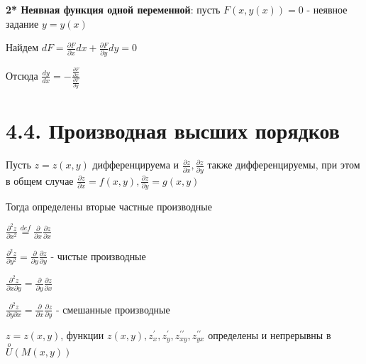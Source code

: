 \documentclass[12pt]{article}
\begin{document}
    \vspace{3mm}
    
    \textbf{2* Неявная функция одной переменной}: пусть $\displaystyle F(x, y(x)) = 0$ - неявное задание $\displaystyle y = y(x)$

    Найдем $\displaystyle dF = \frac{\partial F}{\partial x} dx + \frac{\partial F}{\partial y} dy = 0$

    Отсюда $\displaystyle \frac{dy}{dx} = -\frac{\frac{\partial F}{\partial x}}{\frac{\partial F}{\partial y}}$
    
    \vspace{8mm}

    \section{4.4. Производная высших порядков}

    \hypertarget{secondderivativeoffunctionoftwovariables}{}

    \Nota Пусть $\displaystyle z = z(x, y)$ дифференцируема и $\displaystyle \frac{\partial z}{\partial x}, \frac{\partial z}{\partial y}$ также дифференцируемы, при этом в общем случае
    $\displaystyle \frac{\partial z}{\partial x} = f(x, y), \frac{\partial z}{\partial y} = g(x, y)$

    Тогда определены вторые частные производные
    
    \vspace{3mm}

    \Def $\displaystyle \frac{\partial^2 z}{\partial x^2} \stackrel{def}{=} \frac{\partial}{\partial x} \frac{\partial z}{\partial x}$

    $\displaystyle \frac{\partial^2 z}{\partial y^2} = \frac{\partial}{\partial y} \frac{\partial z}{\partial y}$ - чистые производные


    $\displaystyle \frac{\partial^2 z}{\partial x \partial y} = \frac{\partial}{\partial y} \frac{\partial z}{\partial x}$

    $\displaystyle \frac{\partial^2 z}{\partial y \partial x} = \frac{\partial}{\partial x} \frac{\partial z}{\partial y}$ - смешанные производные

    \vspace{3mm}

    \hypertarget{equalityofsecondderivativesoffunctionoftwovariables}{}

    \Th $\displaystyle z = z(x, y)$, функции $\displaystyle z(x, y), z^\prime_x, z^\prime_y, z^{\prime\prime}_{xy}, z^{\prime\prime}_{yx}$ определены и непрерывны в $\displaystyle \stackrel{o}{U}(M(x, y))$
\end{document}
